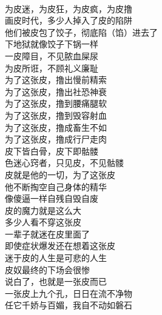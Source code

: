 \begin{poem}[皮奴]
    \begin{multicols}{2}
        \centering~\\
        为皮迷，为皮狂，为皮疯，为皮撸 \\ 画皮时代，多少人掉入了皮的陷阱 \\ 他们被皮包了饺子，彻底陷（馅）进去了 \\ 下地狱就像饺子下锅一样 \\ 一皮障目，不见脓血屎尿 \\ 为皮所诳，不顾礼义廉耻 \\ 为了这张皮，撸出慢前精索 \\ 为了这张皮，撸出社恐神衰 \\ 为了这张皮，撸到腰痛腿软 \\ 为了这张皮，撸到毁容射血 \\ 为了这张皮，撸成畜生不如 \\ 为了这张皮，撸成行尸走肉 \\ 皮下皆白骨，皮下即骷髅 \\ 色迷心窍者，只见皮，不见骷髅 \\ 皮就是他的一切，为了这张皮 \\ 他不断掏空自己身体的精华 \\ 像傻逼一样自残自毁自废 \\ 皮的魔力就是这么大 \\ 多少人看不穿这张皮 \\ 一辈子就迷在皮里面了 \\ 即使症状爆发还在想着这张皮 \\ 迷于皮的人生是可悲的人生 \\ 皮奴最终的下场会很惨 \\ 说白了，也就是一张皮而已 \\ 一张皮上九个孔，日日在流不净物 \\ 任它千娇与百媚，我自不动如磐石
    \end{multicols}
\end{poem}

